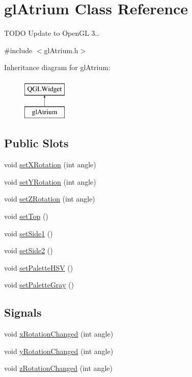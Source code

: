 \hypertarget{classgl_atrium}{\section{gl\+Atrium Class Reference}
\label{classgl_atrium}
}


T\+O\+D\+O Update to Open\+G\+L 3..  




{\ttfamily \#include $<$gl\+Atrium.\+h$>$}

Inheritance diagram for gl\+Atrium\+:\begin{figure}[H]
\begin{center}
\leavevmode
\includegraphics[height=2.000000cm]{classgl_atrium}
\end{center}
\end{figure}
\subsection*{Public Slots}
\begin{DoxyCompactItemize}
\item 
void \hyperlink{classgl_atrium_aa5afd6c2c43a3b9445e6821586671c36}{set\+X\+Rotation} (int angle)
\item 
void \hyperlink{classgl_atrium_a4b339e5080f2019dec3e916b4348f41c}{set\+Y\+Rotation} (int angle)
\item 
void \hyperlink{classgl_atrium_aab5b1212e320c13d3d3f30425f8e2028}{set\+Z\+Rotation} (int angle)
\item 
void \hyperlink{classgl_atrium_adb2aa7af154e4d83ca976bd7042726aa}{set\+Top} ()
\item 
void \hyperlink{classgl_atrium_a1ea5edb0605ee17d77d636c81dbc74a9}{set\+Side1} ()
\item 
void \hyperlink{classgl_atrium_aab139e009363e2a027e4f3a5e3f1e84b}{set\+Side2} ()
\item 
void \hyperlink{classgl_atrium_a5a67ffc011f4545b7ecf4d8a745a6c06}{set\+Palette\+H\+S\+V} ()
\item 
void \hyperlink{classgl_atrium_acf6258aaf1d7c1a8cd7afe558bfd8fa4}{set\+Palette\+Gray} ()
\end{DoxyCompactItemize}
\subsection*{Signals}
\begin{DoxyCompactItemize}
\item 
void \hyperlink{classgl_atrium_add3c45ba71308914e62ac5f07d9dbce4}{x\+Rotation\+Changed} (int angle)
\item 
void \hyperlink{classgl_atrium_a12abcdbba73ff41ea8efdbbdcdbdcb6c}{y\+Rotation\+Changed} (int angle)
\item 
void \hyperlink{classgl_atrium_a71703a9bcfb404b9aa1bdab789573c7e}{z\+Rotation\+Changed} (int angle)
\end{DoxyCompactItemize}
